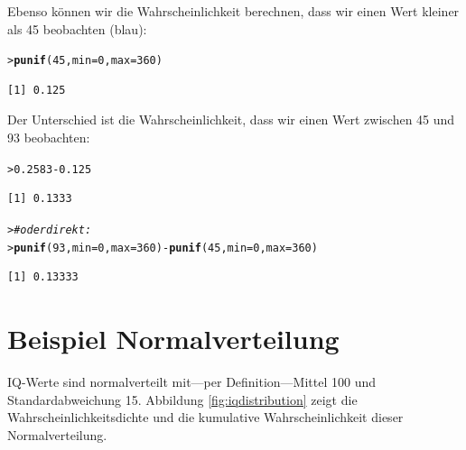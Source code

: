 \documentclass[oneside, 10pt]{book}\usepackage[]{graphicx}\usepackage[]{xcolor}
\makeatletter
\newcommand{\hlnum}[1]{\textcolor[rgb]{0.686,0.059,0.569}{#1}}%
\newcommand{\hlcom}[1]{\textcolor[rgb]{0.678,0.584,0.686}{\textit{#1}}}%
\newcommand{\hlopt}[1]{\textcolor[rgb]{0,0,0}{#1}}%
\newcommand{\hlstd}[1]{\textcolor[rgb]{0.345,0.345,0.345}{#1}}%
\newcommand{\hlkwc}[1]{\textcolor[rgb]{0.333,0.667,0.333}{#1}}%
\newcommand{\hlkwd}[1]{\textcolor[rgb]{0.737,0.353,0.396}{\textbf{#1}}}%
\newenvironment{kframe}{%
 \def\at@end@of@kframe{}%
 \ifinner\ifhmode%
  \def\at@end@of@kframe{\end{minipage}}%
  \begin{minipage}{\columnwidth}%
 \fi\fi%
 \def\FrameCommand##1{\hskip\@totalleftmargin \hskip-\fboxsep
 \colorbox{shadecolor}{##1}\hskip-\fboxsep
     \hskip-\linewidth \hskip-\@totalleftmargin \hskip\columnwidth}%
 \MakeFramed {\advance\hsize-\width
   \@totalleftmargin\z@ \linewidth\hsize
   \@setminipage}}%
 {\par\unskip\endMakeFramed%
 \at@end@of@kframe}
\newenvironment{knitrout}{}{} %
\makeatother
\begin{document}
Ebenso können wir die Wahrscheinlichkeit berechnen,
dass wir einen Wert kleiner als 45 beobachten (blau):
\begin{knitrout}
\color{fgcolor}\begin{kframe}
\begin{alltt}
\hlstd{> }\hlkwd{punif}\hlstd{(}\hlnum{45}\hlstd{,} \hlkwc{min} \hlstd{=} \hlnum{0}\hlstd{,} \hlkwc{max} \hlstd{=} \hlnum{360}\hlstd{)}
\end{alltt}
\begin{verbatim}
[1] 0.125
\end{verbatim}
\end{kframe}
\end{knitrout}

Der Unterschied ist die Wahrscheinlichkeit, dass
wir einen Wert zwischen 45 und 93 beobachten:
\begin{knitrout}
\color{fgcolor}\begin{kframe}
\begin{alltt}
\hlstd{> }\hlnum{0.2583} \hlopt{-} \hlnum{0.125}
\end{alltt}
\begin{verbatim}
[1] 0.1333
\end{verbatim}
\begin{alltt}
\hlstd{> }\hlcom{# oder direkt:}
\hlstd{> }\hlkwd{punif}\hlstd{(}\hlnum{93}\hlstd{,} \hlkwc{min} \hlstd{=} \hlnum{0}\hlstd{,} \hlkwc{max} \hlstd{=} \hlnum{360}\hlstd{)} \hlopt{-} \hlkwd{punif}\hlstd{(}\hlnum{45}\hlstd{,} \hlkwc{min} \hlstd{=} \hlnum{0}\hlstd{,} \hlkwc{max} \hlstd{=} \hlnum{360}\hlstd{)}
\end{alltt}
\begin{verbatim}
[1] 0.13333
\end{verbatim}
\end{kframe}
\end{knitrout}

\section{Beispiel Normalverteilung}
IQ-Werte sind normalverteilt mit---per Definition---Mittel 100
und Standardabweichung 15. Abbildung \ref{fig:iqdistribution}
zeigt die Wahrscheinlichkeitsdichte und die kumulative
Wahrscheinlichkeit dieser Normalverteilung.
\end{document}
